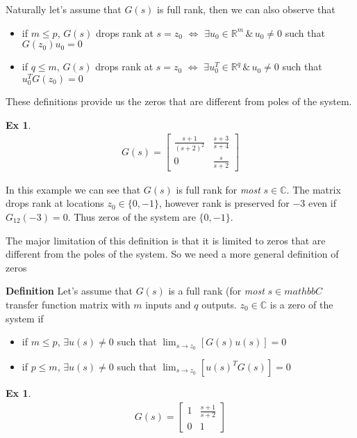 \documentclass[twoside]{article}
\newtheorem{exmp}[theorem]{Ex}
\begin{document}
Naturally let's assume that $G(s)$ is full rank, then we can also observe that
\begin{itemize}
\item if $m \leq p$, $G(s)$ drops rank at $s = z_0$ $\iff$ $\exists u_0 \in \mathbb{R}^{m} \, \& \, u_0 \neq 0$ such that $G(z_0) u_0 = 0$
\item if $q \leq m$, $G(s)$ drops rank at $s = z_0$ $\iff$ $\exists u_0^T \in \mathbb{R}^{q} \, \& \, u_0 \neq 0$ such that $u_0^T G(z_0) = 0$
\end{itemize}

These definitions provide us the zeros that are different from poles of the system. 

\begin{exmp}
	\begin{align*}
	G(s) = \left[ \begin{array}{ccc} \frac{s+1}{(s+2)^2} & \frac{s+3}{s+4}  \\  
	0 & \frac{s}{s+2}  \end{array} \right]
	\end{align*}
\end{exmp}

In this example we can see that $G(s)$ is full rank for \textit{most} $s \in \mathbb{C}$. The matrix drops rank at locations
$z_0 \in \lbrace 0 , -1 \rbrace$, however rank is preserved for $-3$ even if $G_{12}(-3) = 0$. Thus zeros of the system 
are $\lbrace 0 , -1 \rbrace$.

The major limitation of this definition is that it is limited to zeros that are different from the poles of the system. So we 
need a more general definition of zeros 

\textbf{Definition} Let's assume that $G(s)$ is a full rank (for \textit{most} $s \in mathbb{C}$ transfer function matrix with $m$
inputs and $q$ outputs. $z_0 \in \mathbb{C}$ is a zero of the system if
\begin{itemize}
\item if $m \leq p$, $\exists u(s) \neq 0$ such that $\lim_{s \to z_0} [ G(s) u(s) ] = 0$
\item if $p \leq m$, $\exists u(s) \neq 0$ such that $\lim_{s \to z_0} [ u(s)^T G(s) ] = 0$
\end{itemize}

\begin{exmp}
	\begin{align*}
	G(s) = \left[ \begin{array}{ccc} 1 & \frac{s+1}{s+2}  \\  
	0 & 1  \end{array} \right]
	\end{align*}
\end{exmp}
\end{document}
